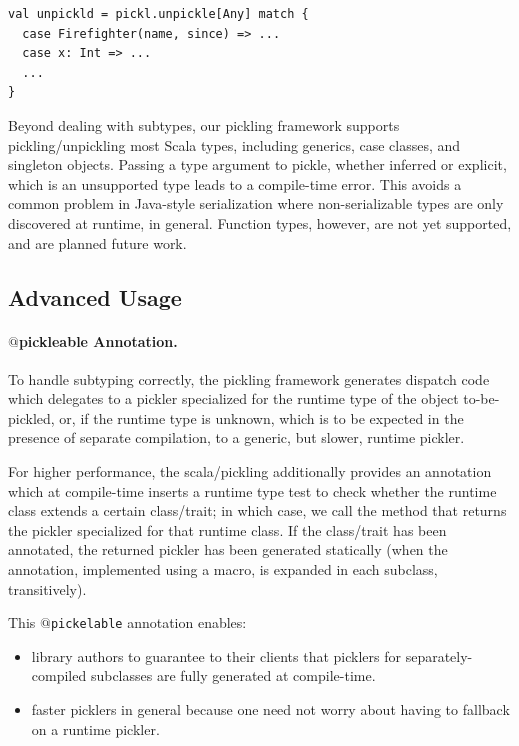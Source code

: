 \documentclass[preprint,10pt]{sigplanconf}
\theoremstyle{definition}
\theoremstyle{definition}
\newcommand{\term}[1]{\mbox{\texttt{#1}}}
\begin{document}
\begin{lstlisting}
val unpickld = pickl.unpickle[Any] match {
  case Firefighter(name, since) => ...
  case x: Int => ...
  ...
}
\end{lstlisting}

Beyond dealing with subtypes, our pickling framework supports
pickling/unpickling most Scala types, including generics, case classes, and
singleton objects. Passing a type argument to pickle, whether inferred or
explicit, which is an unsupported type leads to a compile-time error. This
avoids a common problem in Java-style serialization where non-serializable
types are only discovered at runtime, in general. Function types, however, are
not yet supported, and are planned future work.

\subsection{Advanced Usage}
\label{sec:pickleable-annotation}

\paragraph{$@$pickleable Annotation.} To handle subtyping correctly, the
pickling framework generates dispatch code which delegates to a pickler
specialized for the runtime type of the object to-be-pickled, or, if the
runtime type is unknown, which is to be expected in the presence of separate
compilation, to a generic, but slower, runtime pickler.

For higher performance, the scala/pickling additionally provides an
annotation which at compile-time inserts a runtime type test to check whether
the runtime class extends a certain class/trait; in which case, we call the
method that returns the pickler specialized for that runtime class. If the
class/trait has been annotated, the returned pickler has been generated
statically (when the annotation, implemented using a macro, is expanded in
each subclass, transitively).

This \term{$@$pickelable} annotation enables:

\begin{itemize}
\item library authors to guarantee to their clients that picklers for separately-compiled
subclasses are fully generated at compile-time.

\item faster picklers in general because one need not worry about having to
fallback on a runtime pickler.
\end{itemize}
\end{document}
